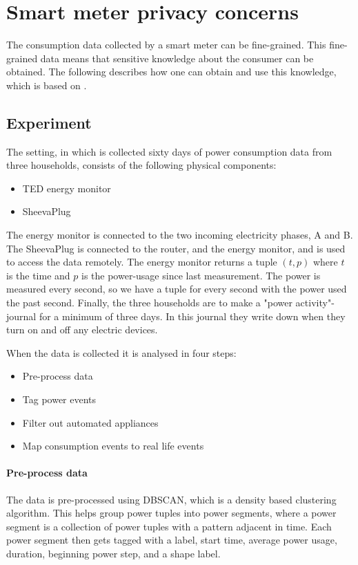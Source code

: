 \section{Smart meter privacy concerns}\label{smart_meter_privacy}
The consumption data collected by a smart meter can be fine-grained.
This fine-grained data means that sensitive knowledge about the consumer can be obtained.
The following describes how one can obtain and use this knowledge, which is based on \citet{privacy_memoir}.

\subsection{Experiment}
The setting, in which is collected sixty days of power consumption data from three households, consists of the following physical components:
\begin{itemize}
\item TED energy monitor
\item SheevaPlug
\end{itemize}
The energy monitor is connected to the two incoming electricity phases, A and B.\cite{TED_installation_guide}
The SheevaPlug is connected to the router, and the energy monitor, and is used to access the data remotely.
The energy monitor returns a tuple $(t,p)$ where $t$ is the time and $p$ is the power-usage since last measurement.
The power is measured every second, so we have a tuple for every second with the power used the past second.
Finally, the three households are to make a "power activity"-journal for a minimum of three days.
In this journal they write down when they turn on and off any electric devices.

When the data is collected it is analysed in four steps:
\begin{itemize}
\item Pre-process data
\item Tag power events
\item Filter out automated appliances
\item Map consumption events to real life events
\end{itemize}

\paragraph{Pre-process data}
The data is pre-processed using DBSCAN, which is a density based clustering algorithm.
This helps group power tuples into power segments, where a power segment is a collection of power tuples with a pattern adjacent in time.
Each power segment then gets tagged with a label, start time, average power usage, duration, beginning power step, and a shape label.


